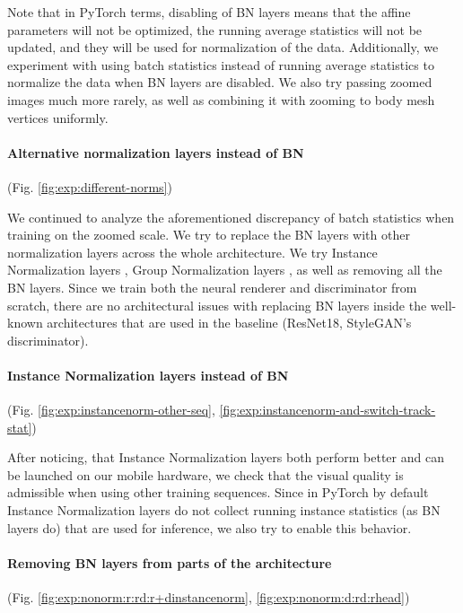 Note that in PyTorch terms, disabling of BN layers means that the affine parameters will not be optimized, the running average statistics will not be updated, and they will be used for normalization of the data. Additionally, we experiment with using batch statistics instead of running average statistics to normalize the data when BN layers are disabled. We also try passing zoomed images much more rarely, as well as combining it with zooming to body mesh vertices uniformly. 

\vspace{-15pt}\paragraph{Alternative normalization layers instead of BN}(Fig. \ref{fig:exp:different-norms})\mbox{}\nopagebreak

We continued to analyze the aforementioned discrepancy of batch statistics when training on the zoomed scale. We try to replace the BN layers with other normalization layers across the whole architecture. We try Instance Normalization layers \cite{dnn:in16}, Group Normalization layers \cite{dnn:groupnorm18}, as well as removing all the BN layers. Since we train both the neural renderer and discriminator from scratch, there are no architectural issues with replacing BN layers inside the well-known architectures that are used in the baseline (ResNet18, StyleGAN's discriminator).

\vspace{-15pt}\paragraph{Instance Normalization layers instead of BN}(Fig. \ref{fig:exp:instancenorm-other-seq}, \ref{fig:exp:instancenorm-and-switch-track-stat})\mbox{}\nopagebreak

After noticing, that Instance Normalization layers both perform better and can be launched on our mobile hardware, we check that the visual quality is admissible when using other training sequences. Since in PyTorch by default Instance Normalization layers do not collect running instance statistics (as BN layers do) that are used for inference, we also try to enable this behavior.

\vspace{-15pt}\paragraph{Removing BN layers from parts of the architecture}(Fig. \ref{fig:exp:nonorm:r:rd:r+dinstancenorm}, \ref{fig:exp:nonorm:d:rd:rhead})\mbox{}\nopagebreak

